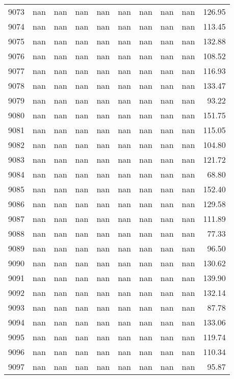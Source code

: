 \begin{tabular}{lrrrrrrrrr}
9073 & nan & nan & nan & nan & nan & nan & nan & nan & 126.95 \\
9074 & nan & nan & nan & nan & nan & nan & nan & nan & 113.45 \\
9075 & nan & nan & nan & nan & nan & nan & nan & nan & 132.88 \\
9076 & nan & nan & nan & nan & nan & nan & nan & nan & 108.52 \\
9077 & nan & nan & nan & nan & nan & nan & nan & nan & 116.93 \\
9078 & nan & nan & nan & nan & nan & nan & nan & nan & 133.47 \\
9079 & nan & nan & nan & nan & nan & nan & nan & nan & 93.22 \\
9080 & nan & nan & nan & nan & nan & nan & nan & nan & 151.75 \\
9081 & nan & nan & nan & nan & nan & nan & nan & nan & 115.05 \\
9082 & nan & nan & nan & nan & nan & nan & nan & nan & 104.80 \\
9083 & nan & nan & nan & nan & nan & nan & nan & nan & 121.72 \\
9084 & nan & nan & nan & nan & nan & nan & nan & nan & 68.80 \\
9085 & nan & nan & nan & nan & nan & nan & nan & nan & 152.40 \\
9086 & nan & nan & nan & nan & nan & nan & nan & nan & 129.58 \\
9087 & nan & nan & nan & nan & nan & nan & nan & nan & 111.89 \\
9088 & nan & nan & nan & nan & nan & nan & nan & nan & 77.33 \\
9089 & nan & nan & nan & nan & nan & nan & nan & nan & 96.50 \\
9090 & nan & nan & nan & nan & nan & nan & nan & nan & 130.62 \\
9091 & nan & nan & nan & nan & nan & nan & nan & nan & 139.90 \\
9092 & nan & nan & nan & nan & nan & nan & nan & nan & 132.14 \\
9093 & nan & nan & nan & nan & nan & nan & nan & nan & 87.78 \\
9094 & nan & nan & nan & nan & nan & nan & nan & nan & 133.06 \\
9095 & nan & nan & nan & nan & nan & nan & nan & nan & 119.74 \\
9096 & nan & nan & nan & nan & nan & nan & nan & nan & 110.34 \\
9097 & nan & nan & nan & nan & nan & nan & nan & nan & 95.87 \\

\end{tabular}
